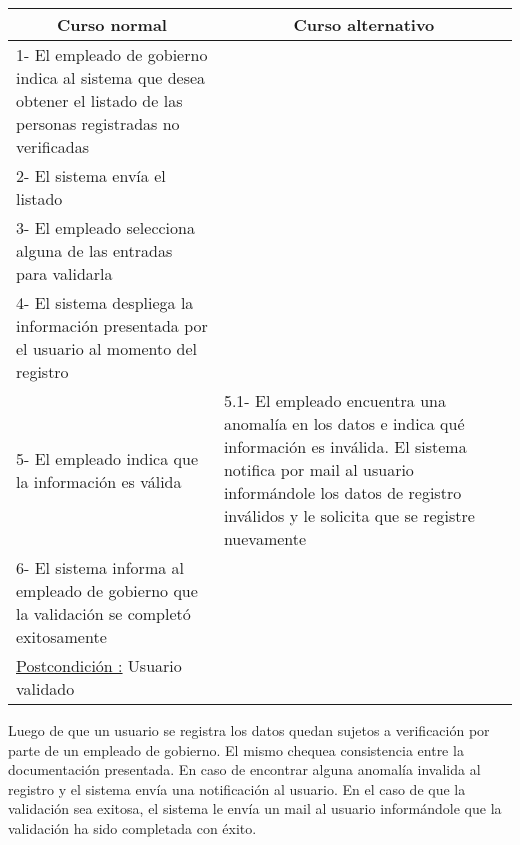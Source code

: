 \begin{center}
    \centering
    \begin{tabular}{ | p{11cm} | p{6cm} | }
    	\multicolumn{1}{c}{\cellcolor{black!30}\textbf{Curso normal}} & 
    	\multicolumn{1}{c}{\cellcolor{black!30}\textbf{Curso alternativo}} \\ \hline
    	1- El empleado de gobierno indica al sistema que desea obtener el listado de las personas registradas no verificadas & \\ \hline
    	2- El sistema envía el listado & \\ \hline
    	3- El empleado selecciona alguna de las entradas para validarla & \\ \hline
    	4- El sistema despliega la información presentada por el usuario al momento del registro & \\ \hline
    	5- El empleado indica que la información es válida & 5.1- El empleado encuentra una anomalía en los datos e indica qué información es inválida. El sistema notifica por mail al usuario
    	informándole los datos de registro inválidos y le solicita que se registre nuevamente \\ \hline
    	6- El sistema informa al empleado de gobierno que la validación se completó exitosamente & \\ \hline
    	\underline{Postcondición :} Usuario validado & \\ \hline
    \end{tabular}
\end{center}

Luego de que un usuario se registra los datos quedan sujetos a verificación por parte de un empleado de gobierno. El mismo chequea consistencia entre la documentación presentada.
En caso de encontrar alguna anomalía invalida al registro y el sistema envía una notificación al usuario. En el caso de que la validación sea exitosa, el sistema le envía un mail
al usuario informándole que la validación ha sido completada con éxito.
~




